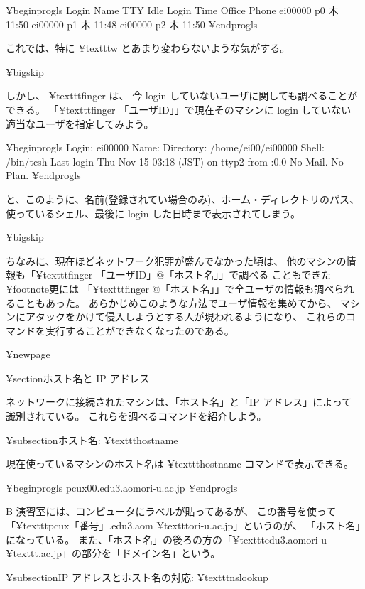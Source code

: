 ¥begin{progls}
Login            Name                 TTY  Idle  Login Time   Office  Phone
ei00000                               p0         木     11:50
ei00000                               p1         木     11:48
ei00000                               p2         木     11:50
%
¥end{progls}

これでは、特に ¥texttt{w} とあまり変わらないような気がする。

¥bigskip

しかし、 ¥texttt{finger} は、
今 login していないユーザに関しても調べることができる。
「¥texttt{finger 「ユーザID」}」で現在そのマシンに login していない
適当なユーザを指定してみよう。

¥begin{progls}
Login: ei00000                          Name: 
Directory: /home/ei00/ei00000           Shell: /bin/tcsh
Last login Thu Nov 15 03:18 (JST) on ttyp2 from :0.0
No Mail.
No Plan.
%
¥end{progls}

と、このように、名前(登録されてい場合のみ)、ホーム・ディレクトリのパス、
使っているシェル、最後に login した日時まで表示されてしまう。

¥bigskip

ちなみに、現在ほどネットワーク犯罪が盛んでなかった頃は、
他のマシンの情報も「¥texttt{finger 「ユーザID」@「ホスト名」}」で調べる
こともできた¥footnote{更には
「¥texttt{finger @「ホスト名」}」で全ユーザの情報も調べられることもあった。
あらかじめこのような方法でユーザ情報を集めてから、
マシンにアタックをかけて侵入しようとする人が現われるようになり、
これらのコマンドを実行することができなくなったのである}。

¥newpage

¥section{ホスト名と IP アドレス}

ネットワークに接続されたマシンは、「ホスト名」と「IP アドレス」によって
識別されている。
これらを調べるコマンドを紹介しよう。

¥subsection{ホスト名: ¥texttt{hostname}}

現在使っているマシンのホスト名は ¥texttt{hostname} コマンドで表示できる。

¥begin{progls}
pcux00.edu3.aomori-u.ac.jp
%
¥end{progls}

 B 演習室には、コンピュータにラベルが貼ってあるが、
この番号を使って
「¥texttt{pcux「番号」.edu3.aom}
¥texttt{ori-u.ac.jp}」というのが、
「ホスト名」になっている。
また、「ホスト名」の後ろの方の「¥texttt{edu3.aomori-u}
¥texttt{.ac.jp}」の部分を「ドメイン名」という。

¥subsection{IP アドレスとホスト名の対応: ¥texttt{nslookup}}


